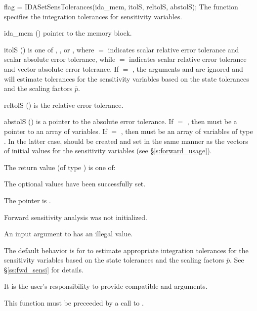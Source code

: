 {
  flag = IDASetSensTolerances(ida\_mem, itolS, reltolS, abstolS);
}
{
  The function  specifies the integration tolerances for
  sensitivity variables.
}
{
  \begin{args}
  \item[ida\_mem] ()
    pointer to the {\idas} memory block.
  \item[itolS]  () 
    is one of , , or , where  $=$  indicates scalar relative error 
    tolerance and scalar absolute error tolerance, while  $=$  indicates scalar
    relative error tolerance and vector absolute error tolerance.
    If  $=$ , the arguments  and  are ignored and
    {\idas} will estimate tolerances for the sensitivity variables based on the state
    tolerances and the scaling factors $\bar p$.
  \item[reltolS] ()
    is the relative error tolerance.
  \item[abstolS] ()
    is a pointer to the absolute error tolerance. 
    If  $=$ , then  must be a pointer to an array
    of  variables. 
    If  $=$ , then  must be an array of 
    variables of type  . In the latter case,  should be
    created and set in the same manner as the vectors of initial values for the
    sensitivity variables (see \S\ref{s:forward_usage}).
  \end{args}
}
{
  The return value  (of type ) is one of:
  \begin{args}
  \item[\Id{IDA\_SUCCESS}] 
    The optional values have been successfully set.
  \item[\Id{IDA\_MEM\_NULL}]
    The  pointer is .
  \item[\Id{IDA\_NO\_SENS}]
    Forward sensitivity analysis was not initialized.
  \item[\Id{IDA\_ILL\_INPUT}]
     An input argument to  has an illegal value.
  \end{args}
}
{
  The default behavior is for {\idas} to estimate appropriate integration 
  tolerances for the sensitivity variables based on the state tolerances and
  the scaling factors ${\bar p}$. See \S\ref{ss:fwd_sensi} for details.

  {\warn}It is the user's responsibility to provide compatible  and
   arguments.

  This function must be preceeded by a call to .
}
